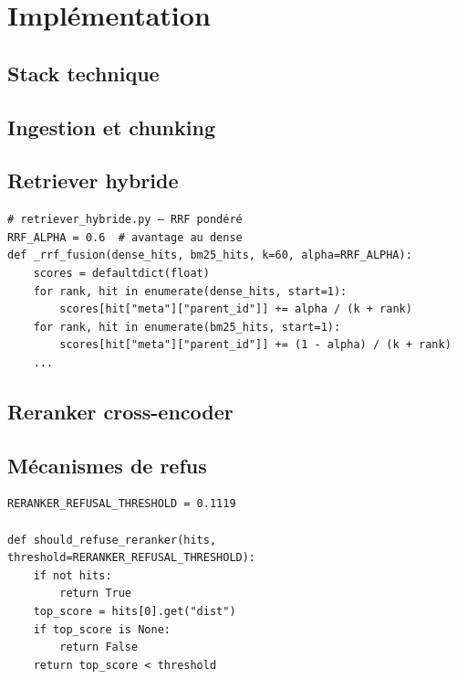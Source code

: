 \documentclass{rapportECL}
\begin{document}
\section{Implémentation}

\subsection{Stack technique}

\subsection{Ingestion et chunking}

\subsection{Retriever hybride}

\begin{lstlisting}[caption={Fusion RRF pondérée}, label={lst:rrf}]
# retriever_hybride.py — RRF pondéré
RRF_ALPHA = 0.6  # avantage au dense
def _rrf_fusion(dense_hits, bm25_hits, k=60, alpha=RRF_ALPHA):
    scores = defaultdict(float)
    for rank, hit in enumerate(dense_hits, start=1):
        scores[hit["meta"]["parent_id"]] += alpha / (k + rank)
    for rank, hit in enumerate(bm25_hits, start=1):
        scores[hit["meta"]["parent_id"]] += (1 - alpha) / (k + rank)
    ...
\end{lstlisting}

\subsection{Reranker cross-encoder}

\subsection{Mécanismes de refus}

\begin{lstlisting}[caption={Refus basé sur le score du cross-encoder}, label={lst:refusal}]
RERANKER_REFUSAL_THRESHOLD = 0.1119

def should_refuse_reranker(hits, threshold=RERANKER_REFUSAL_THRESHOLD):
    if not hits:
        return True
    top_score = hits[0].get("dist")
    if top_score is None:
        return False
    return top_score < threshold
\end{lstlisting}
\end{document}
